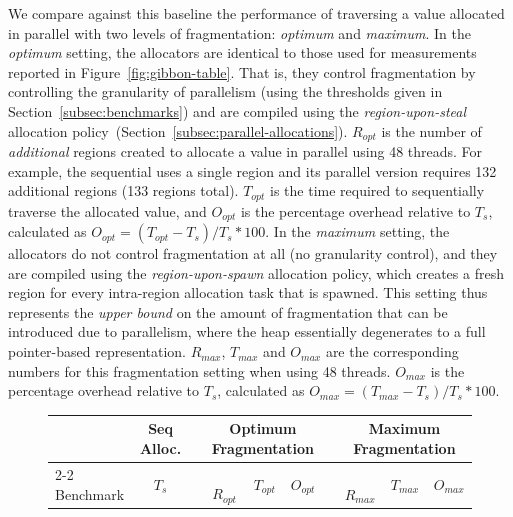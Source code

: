 \documentclass[acmsmall,acmthm=false,nonacm]{acmart}
\theoremstyle{straighttext0}
\theoremstyle{straighttext}
\newcommand{\Secref}[1]{Section~\ref{#1}}
\newcommand{\Figref}[1]{Figure~\ref{#1}}
\begin{document}
{{We compare against this baseline the performance of traversing
a value allocated in parallel with two levels of fragmentation:
\textit{optimum} and \textit{maximum}.
%
In the \textit{optimum} setting, the allocators are identical to
those used for measurements reported in \Figref{fig:gibbon-table}.
%
That is, they control fragmentation by
controlling the granularity of parallelism
(using the thresholds given in \Secref{subsec:benchmarks})
and are compiled using the {\em region-upon-steal} allocation
policy~(\Secref{subsec:parallel-allocations}).
%
$R_{\mathit{opt}}$ is the number of {\em additional} regions created to allocate a value in parallel using 48 threads.
%
For example, the sequential  uses a single region
and its parallel version requires 132 additional regions (133 regions total).
%
$T_{\mathit{opt}}$ is the time required to sequentially traverse the allocated value,
and $O_{\mathit{opt}}$ is the percentage overhead relative to $T_s$, calculated as
$O_{\mathit{opt}} = (T_{\mathit{opt}} - T_s) / T_s * 100$.
%
In the \textit{maximum} setting,
the allocators do not control fragmentation at all (no granularity control),
and they are compiled
using the {\em region-upon-spawn} allocation policy, which creates a fresh
region for every intra-region allocation task that is spawned.
%
This setting thus represents the {\em upper bound} on the amount of fragmentation that can be
introduced due to parallelism, where the heap essentially degenerates
to a full pointer-based representation.
%
$R_{\mathit{max}}$, $T_{\mathit{max}}$ and $O_{\mathit{max}}$ are the corresponding
numbers for this fragmentation setting when using 48 threads.
%
$O_{\mathit{max}}$ is the percentage overhead relative to $T_s$, calculated as
$O_{\mathit{max}} = (T_{\mathit{max}} - T_s) / T_s * 100$.
}


{

\begin{figure}

  \begin{tabular}{l c r ccc r ccc}
    \toprule
    & Seq Alloc. & \phantom{} & \multicolumn{3}{c}{Optimum Fragmentation} & \phantom{} & \multicolumn{3}{c}{Maximum Fragmentation} \\
    \cmidrule{2-2}
    \cmidrule{4-6}
    \cmidrule{8-10}
    Benchmark & $T_s$ && $\;\;\;$ $R_{\mathit{opt}}$ & $T_{\mathit{opt}}$ & $O_{\mathit{opt}}$ && $\;\;\;$ $R_{\mathit{max}}$ & $T_{\mathit{max}}$ & $O_{\mathit{max}}$ \\


\end{tabular}
\end{figure}}}
\end{document}
